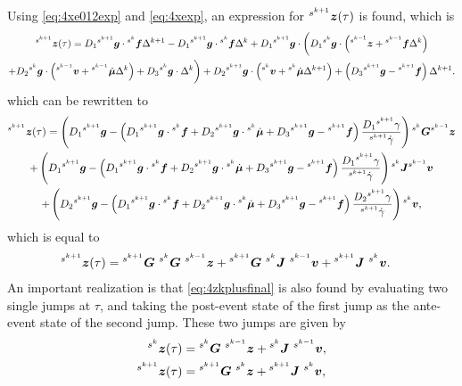 \documentclass[../DC2017114Bouma.tex]{subfiles}
\begin{document}
Using \eqref{eq:4xe012exp} and \eqref{eq:4xexp}, an expression for $\ls^{s^{k+1}}\zb(\tau)$ is found, which is
\begin{multline}
\ls^{s^{k+1}}\zb(\tau) = D_1\ls^{s^{k+1}}\gb\cdot\ls^{s^{k}}\fb\Delta^{k+1} - D_1\ls^{s^{k+1}}\gb\cdot\ls^{s^{k}}\fb\Delta^{k} + D_1\ls^{s^{k+1}}\gb\cdot \bigg( D_1\ls^{s^{k}}\gb\cdot\left(\ls^{s^{k-1}}\zb+\ls^{s^{k-1}}\fb\Delta^{k}\right)\\
+D_2\ls^{s^{k}}\gb\cdot\left(\ls^{s^{k-1}}\vb+\ls^{s^{k-1}}\dot{\mub}\Delta^{k}\right)+D_3\ls^{s^{k}}\gb\cdot\Delta^{k}\bigg) + D_2 \ls^{s^{k+1}}\gb\cdot\left(\ls^{s^{k}}\vb+\ls^{s^{k}}\dot{\mub}\Delta^{k+1} \right) + \left(D_3\ls^{s^{k+1}}\gb - \ls^{s^{k+1}}\fb\right)\Delta^{k+1}.\label{eq:4ztau}
\end{multline}
which can be rewritten to 
\begin{multline}
\ls^{s^{k+1}}\zb(\tau) = \left(D_1\ls^{s^{k+1}}\gb - \left(D_1\ls^{s^{k+1}}\gb\cdot\ls^{s^{k}}\fb  + D_2\ls^{s^{k+1}}\gb\cdot\ls^{s^{k}}\dot{\mub} + D_3\ls^{s^{k+1}}\gb - \ls^{s^{k+1}}\fb\right)\frac{D_1\ls^{s^{k+1}}\gamma}{\ls^{s^{k+1}}\dot{\gamma}} \right)\ls^{s^k}\Gb\ls^{s^{k-1}}\zb\\
+ \left(D_1\ls^{s^{k+1}}\gb - \left(D_1\ls^{s^{k+1}}\gb\cdot\ls^{s^{k}}\fb  + D_2\ls^{s^{k+1}}\gb\cdot\ls^{s^{k}}\dot{\mub} + D_3\ls^{s^{k+1}}\gb - \ls^{s^{k+1}}\fb\right)\frac{D_1\ls^{s^{k+1}}\gamma}{\ls^{s^{k+1}}\dot{\gamma}} \right)\ls^{s^k}\Jb\ls^{s^{k-1}}\vb\\
+ \left(D_2\ls^{s^{k+1}}\gb - \left(D_1\ls^{s^{k+1}}\gb\cdot\ls^{s^{k}}\fb  + D_2\ls^{s^{k+1}}\gb\cdot\ls^{s^{k}}\dot{\mub} + D_3\ls^{s^{k+1}}\gb - \ls^{s^{k+1}}\fb\right)\frac{D_2\ls^{s^{k+1}}\gamma}{\ls^{s^{k+1}}\dot{\gamma}} \right)\ls^{s^{k}}\vb,
\end{multline}
which is equal to
\begin{align}
&\ls^{s^{k+1}}\zb(\tau) = \ls^{s^{k+1}}\Gb\ \ls^{s^{k}}\Gb\ \ls^{s^{k-1}}\zb + \ls^{s^{k+1}}\Gb\ \ls^{s^{k}}\Jb\ \ls^{s^{k-1}}\vb + \ls^{s^{k+1}}\Jb\ \ls^{s^{k}}\vb.\label{eq:4zkplusfinal}
\end{align}
An important realization is that \eqref{eq:4zkplusfinal} is also found by evaluating two single jumps at $\tau$, and taking the post-event state of the first jump as the ante-event state of the second jump. These two jumps are given by
\begin{align}
\ls^{s^{k}}\zb(\tau) &= \ls^{s^{k}}\Gb\ \ls^{s^{k-1}}\zb + \ls^{s^{k}}\Jb\ \ls^{s^{k-1}}\vb,\\
\ls^{s^{k+1}}\zb(\tau) &= \ls^{s^{k+1}}\Gb\ \ls^{s^{k}}\zb + \ls^{s^{k+1}}\Jb\ \ls^{s^{k}}\vb,
\end{align}
\end{document}

